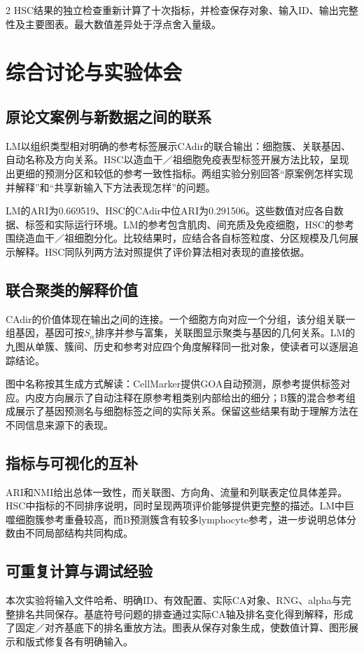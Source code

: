 \begin{multicols}{2}\raggedcolumns
HSC结果的独立检查重新计算了十次指标，并检查保存对象、输入ID、输出完整性及主要图表。最大数值差异处于浮点舍入量级。

\section{综合讨论与实验体会}
\subsection{原论文案例与新数据之间的联系}
LM以组织类型相对明确的参考标签展示CAdir的联合输出：细胞簇、关联基因、自动名称及方向关系。HSC以造血干／祖细胞免疫表型标签开展方法比较，呈现出更细的预测分区和较低的参考一致性指标。两组实验分别回答“原案例怎样实现并解释”和“共享新输入下方法表现怎样”的问题。

LM的ARI为\allowbreak{}0.669519、HSC的CAdir中位ARI为\allowbreak{}0.291506。这些数值对应各自数据、标签和实际运行环境。LM的参考包含肌肉、间充质及免疫细胞，HSC的参考围绕造血干／祖细胞分化。比较结果时，应结合各自标签粒度、分区规模及几何展示解释。HSC同队列两方法对照提供了评价算法相对表现的直接依据。

\subsection{联合聚类的解释价值}
CAdir的价值体现在输出之间的连接。一个细胞方向对应一个分组，该分组关联一组基因，基因可按$S_\alpha$排序并参与富集，关联图显示聚类与基因的几何关系。LM的九图从单簇、簇间、历史和参考对应四个角度解释同一批对象，使读者可以逐层追踪结论。

图中名称按其生成方式解读：CellMarker提供GOA自动预测，原参考提供标签对应。内皮方向展示了自动注释在原参考粗类别内部给出的细分；B簇的混合参考组成展示了基因预测名与细胞标签之间的实际关系。保留这些结果有助于理解方法在不同信息来源下的表现。

\subsection{指标与可视化的互补}
ARI和NMI给出总体一致性，而关联图、方向角、流量和列联表定位具体差异。HSC中指标的不同排序说明，同时呈现两项评价能够提供更完整的描述。LM中巨噬细胞簇参考重叠较高，而B预测簇含有较多lymphocyte参考，进一步说明总体分数由不同局部结构共同构成。

\subsection{可重复计算与调试经验}
本次实验将输入文件哈希、明确ID、有效配置、实际CA对象、RNG、alpha与完整排名共同保存。基底符号问题的排查通过实际CA轴及排名变化得到解释，形成了固定／对齐基底下的排名重放方法。图表从保存对象生成，使数值计算、图形展示和版式修复各有明确输入。


\end{multicols}
